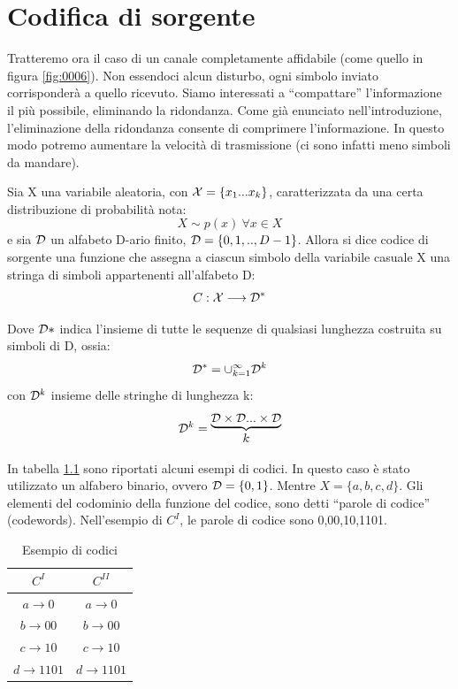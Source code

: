 \chapter{Codifica di sorgente}

Tratteremo ora il caso di un canale completamente affidabile (come quello in figura \ref{fig:0006}). Non essendoci alcun disturbo, ogni 
simbolo inviato corrisponderà a quello ricevuto. Siamo interessati a ``compattare'' l'informazione il più possibile, eliminando
la ridondanza. Come già enunciato nell'introduzione, l'eliminazione della ridondanza consente di comprimere l'informazione. In questo modo potremo aumentare la velocità di trasmissione (ci sono infatti meno simboli da mandare).

\begin{definizione} 
Sia X una variabile aleatoria, con \(\mathcal{X} = \{x_1 ... x_k\}\), caratterizzata da una certa distribuzione di probabilità nota:
\[X \sim p(x) \ \forall x \in X\]
e sia $\mathcal{D}$ un alfabeto D-ario finito, $\mathcal{D}=\{0,1,..,D-1\}$. Allora si dice codice di sorgente una funzione che assegna a ciascun simbolo della variabile casuale X una stringa di simboli appartenenti all'alfabeto D:
\[C: \mathcal{X} \longrightarrow \mathcal{D}^*\]
\end{definizione}
Dove \(\mathcal{D}*\) indica l'insieme di tutte le sequenze di qualsiasi lunghezza costruita su simboli di D, ossia:
\[\mathcal{D}^* = \cup_{k = 1}^\infty \mathcal{D}^k\]
con \(\mathcal{D}^k\) insieme delle stringhe di lunghezza k:
\[\mathcal{D}^k = \begin{matrix}  \underbrace{\mathcal{D} \times \mathcal{D} ... \times \mathcal{D}} \\ k
\end{matrix}\]

In tabella \ref{tab:codici1} sono riportati alcuni esempi di codici. In questo caso è stato utilizzato un alfabero 
binario, ovvero $\mathcal{D}=\{0,1\}$. Mentre $X=\{a,b,c,d\}$. Gli elementi del codominio della funzione del codice, sono detti ``parole di codice'' (codewords). Nell'esempio di $C^I$, le parole di codice sono 0,00,10,1101.


\begin{table}[htbp]
  \begin{center}
   \begin{tabular}{c|c}
	$C^I$ & $C^{II}$ \\
       \hline
	$a \to 0$ & $a \to 0$ \\ 
	$b \to 00$ & $b \to 00$ \\ 
	$c \to 10$ & $c \to 10$ \\ 
        $d \to 1101$ & $d \to 1101$ \\ 
    \end{tabular}
     
     \caption{Esempio di codici}
    \label{tab:codici1}
  \end{center}
\end{table}

